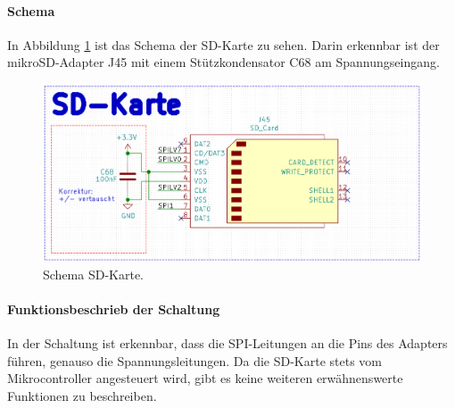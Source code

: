

\paragraph{Schema}\mbox{}

In Abbildung \ref{fig:Schema_SD_Karte} ist das Schema der SD-Karte zu sehen. Darin erkennbar ist der mikroSD-Adapter J45 mit einem Stützkondensator C68 am Spannungseingang.

\begin{figure}[H]
\center
\includegraphics[width = 0.6 \textwidth]{graphics/Schema_SD_Karte}
\caption{Schema SD-Karte.}
\label{fig:Schema_SD_Karte}
\end{figure}

\paragraph{Funktionsbeschrieb der Schaltung}\mbox{}

In der Schaltung ist erkennbar, dass die SPI-Leitungen an die Pins des Adapters führen, genauso die Spannungsleitungen. Da die SD-Karte stets vom Mikrocontroller angesteuert wird, gibt es keine weiteren erwähnenswerte Funktionen zu beschreiben.